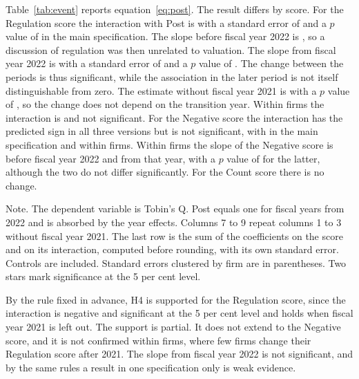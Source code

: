 \documentclass[12pt,a4paper]{article}
\newcommand{\tablenote}[1]{\par\smallskip\begin{minipage}{\linewidth}\footnotesize\setstretch{1.05}#1\end{minipage}}
\newcommand{\widetable}[1]{\resizebox{\ifdim\width>\linewidth\linewidth\else\width\fi}{!}{}}
\begin{document}
Table~\ref{tab:event} reports equation~\eqref{eq:post}. The result differs by score. For the Regulation score the interaction with Post is \coefEReg{} with a standard error of \seEReg{} and a $p$ value of \pvalEReg{} in the main specification. The slope before fiscal year 2022 is \coefPreEReg{}, so a discussion of regulation was then unrelated to valuation. The slope from fiscal year 2022 is \coefSlopeEReg{} with a standard error of \seSlopeEReg{} and a $p$ value of \pvalSlopeEReg{}. The change between the periods is thus significant, while the association in the later period is not itself distinguishable from zero. The estimate without fiscal year 2021 is \coefEDReg{} with a $p$ value of \pvalEDReg{}, so the change does not depend on the transition year. Within firms the interaction is \coefEFReg{} and not significant. For the Negative score the interaction has the predicted sign in all three versions but is not significant, with \coefENeg{} in the main specification and \coefEFNeg{} within firms. Within firms the slope of the Negative score is \coefPreEFNeg{} before fiscal year 2022 and \coefSlopeEFNeg{} from that year, with a $p$ value of \pvalSlopeEFNeg{} for the latter, although the two do not differ significantly. For the Count score there is no change.

\begin{table}[!htbp]
\centering\footnotesize
\caption{Biodiversity scores and Tobin's Q after the Kunming Declaration}\label{tab:event}
\widetable{tables/tab_event}
\tablenote{Note. The dependent variable is Tobin's Q. Post equals one for fiscal years from 2022 and is absorbed by the year effects. Columns 7 to 9 repeat columns 1 to 3 without fiscal year 2021. The last row is the sum of the coefficients on the score and on its interaction, computed before rounding, with its own standard error. Controls are included. Standard errors clustered by firm are in parentheses. Two stars mark significance at the 5 per cent level.}
\end{table}

By the rule fixed in advance, H4 is supported for the Regulation score, since the interaction is negative and significant at the 5 per cent level and holds when fiscal year 2021 is left out. The support is partial. It does not extend to the Negative score, and it is not confirmed within firms, where few firms change their Regulation score after 2021. The slope from fiscal year 2022 is not significant, and by the same rules a result in one specification only is weak evidence.
\end{document}
